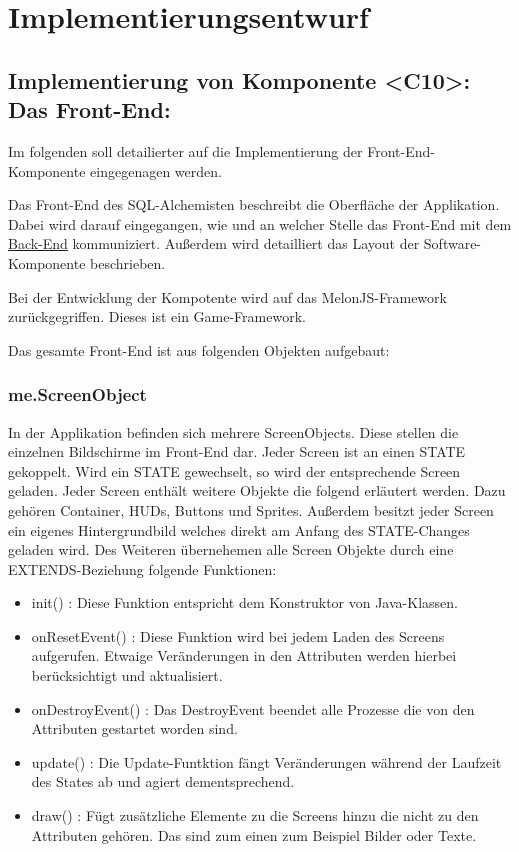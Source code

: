 
\chapter{Implementierungsentwurf}


\section{Implementierung von Komponente <C10>: Das Front-End:}

Im folgenden soll detailierter auf die Implementierung der Front-End-Komponente eingegenagen werden.

Das Front-End des SQL-Alchemisten beschreibt die Oberfläche der Applikation. Dabei wird darauf eingegangen, wie und an welcher Stelle das Front-End mit dem \hyperref[backend]{Back-End} kommuniziert. Außerdem wird detailliert das Layout der Software-Komponente beschrieben.

Bei der Entwicklung der Kompotente wird auf das MelonJS-Framework zurückgegriffen. Dieses ist ein Game-Framework.

Das gesamte Front-End ist aus folgenden Objekten aufgebaut:

\subsection{me.ScreenObject}
\label{ScreenObject}

In der Applikation befinden sich mehrere ScreenObjects. Diese stellen die einzelnen Bildschirme im Front-End dar. Jeder
Screen ist an einen STATE gekoppelt. Wird ein STATE gewechselt, so wird der entsprechende Screen geladen. Jeder Screen 
enth\"alt weitere Objekte die folgend erl\"autert werden. Dazu geh\"oren Container, HUDs, Buttons und Sprites. Au{\ss}erdem besitzt
jeder Screen ein eigenes Hintergrundbild welches direkt am Anfang des STATE-Changes geladen wird. Des Weiteren \"ubernehemen
alle Screen Objekte durch eine EXTENDS-Beziehung folgende Funktionen:
\begin{itemize}
	\item init() : Diese Funktion entspricht dem Konstruktor von Java-Klassen.
	\item onResetEvent() : Diese Funktion wird bei jedem Laden des Screens aufgerufen. Etwaige Ver\"anderungen in den Attributen 
	         werden hierbei ber\"ucksichtigt und aktualisiert.
	\item onDestroyEvent() : Das DestroyEvent beendet alle Prozesse die von den Attributen gestartet worden sind.           
	\item update() : Die Update-Funtktion f\"angt Ver\"anderungen w\"ahrend der Laufzeit des States ab und agiert dementsprechend.
	\item draw() : F\"ugt zus\"atzliche Elemente zu die Screens hinzu die nicht zu den Attributen geh\"oren. Das sind zum einen
		 zum Beispiel Bilder oder Texte.  
\end{itemize}

